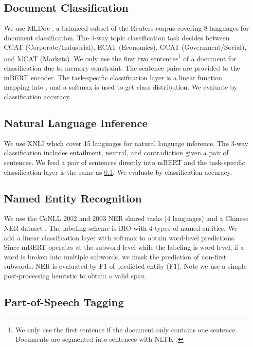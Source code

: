 \documentclass[11pt,a4paper]{article}
\begin{document}
\subsection{Document Classification}\label{sec:mldoc}
We use MLDoc \cite{schwenk-li-2018-corpus}, a balanced subset of the Reuters corpus covering 8 languages for document classification. The 4-way topic classification task decides between CCAT (Corporate/Industrial), ECAT (Economics), GCAT (Government/Social), and MCAT (Markets). We only use the first two sentences\footnote{We only use the first sentence if the document only contains one sentence. Documents are segmented into sentences with NLTK \cite{perkins2014python}.} of a document for classification due to memory constraint. The sentence pairs are provided to the mBERT encoder. The task-specific classification layer is a linear function mapping  into , and a softmax is used to get class distribution. We evaluate by classification accuracy.

\subsection{Natural Language Inference}
We use XNLI \cite{conneau-etal-2018-xnli} which cover 15 languages for natural language inference. The 3-way classification includes entailment, neutral, and contradiction given a pair of sentences. We feed a pair of sentences directly into mBERT and the task-specific classification layer is the same as \cref{sec:mldoc}. We evaluate by classification accuracy.

\subsection{Named Entity Recognition}\label{sec:ner}

We use the CoNLL 2002 and 2003 NER shared tasks \cite{tjong-kim-sang-2002-introduction,tjong-kim-sang-de-meulder-2003-introduction} (4 languages) and a Chinese NER dataset \cite{levow-2006-third}. The labeling scheme is BIO with 4 types of named entities. We add a linear classification layer with softmax to obtain word-level predictions. Since mBERT operates at the subword-level while the labeling is word-level, if a word is broken into multiple subwords, we mask the prediction of non-first subwords.
NER is evaluated by F1 of predicted entity (F1). Note we use a simple post-processing heuristic to obtain a valid span.

\subsection{Part-of-Speech Tagging}
\end{document}
